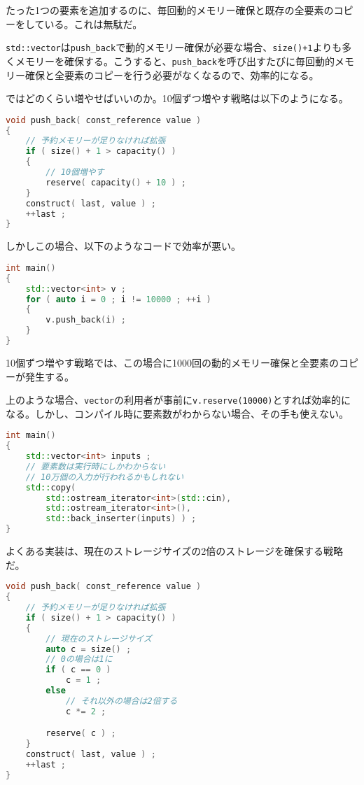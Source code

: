たった1つの要素を追加するのに、毎回動的メモリー確保と既存の全要素のコピーをしている。これは無駄だ。

\texttt{std::vector}は\texttt{push\_back}で動的メモリー確保が必要な場合、\texttt{size()+1}よりも多くメモリーを確保する。こうすると、\texttt{push\_back}を呼び出すたびに毎回動的メモリー確保と全要素のコピーを行う必要がなくなるので、効率的になる。

ではどのくらい増やせばいいのか。10個ずつ増やす戦略は以下のようになる。

\begin{lstlisting}[language={C++}]
void push_back( const_reference value ) 
{
    // 予約メモリーが足りなければ拡張
    if ( size() + 1 > capacity() )
    {
        // 10個増やす
        reserve( capacity() + 10 ) ;
    }
    construct( last, value ) ;
    ++last ;
}
\end{lstlisting}

しかしこの場合、以下のようなコードで効率が悪い。

\begin{lstlisting}[language={C++}]
int main()
{
    std::vector<int> v ;
    for ( auto i = 0 ; i != 10000 ; ++i )
    {
        v.push_back(i) ;
    }
}
\end{lstlisting}

10個ずつ増やす戦略では、この場合に1000回の動的メモリー確保と全要素のコピーが発生する。

上のような場合、\texttt{vector}の利用者が事前に\texttt{v.reserve(10000)}とすれば効率的になる。しかし、コンパイル時に要素数がわからない場合、その手も使えない。

\ifTombow\pagebreak\fi
\begin{lstlisting}[language={C++}]
int main()
{
    std::vector<int> inputs ;
    // 要素数は実行時にしかわからない
    // 10万個の入力が行われるかもしれない
    std::copy(
        std::ostream_iterator<int>(std::cin),
        std::ostream_iterator<int>(),
        std::back_inserter(inputs) ) ;
}
\end{lstlisting}

よくある実装は、現在のストレージサイズの2倍のストレージを確保する戦略だ。

\begin{lstlisting}[language={C++}]
void push_back( const_reference value ) 
{
    // 予約メモリーが足りなければ拡張
    if ( size() + 1 > capacity() )
    {
        // 現在のストレージサイズ
        auto c = size() ;
        // 0の場合は1に
        if ( c == 0 )
            c = 1 ;
        else
            // それ以外の場合は2倍する
            c *= 2 ;

        reserve( c ) ;
    }
    construct( last, value ) ;
    ++last ;
}
\end{lstlisting}

